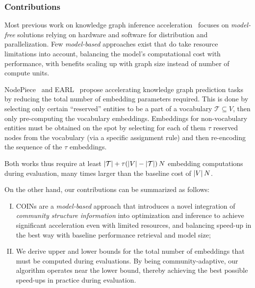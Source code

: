 \subsubsection{Contributions}
Most previous work on knowledge graph inference acceleration~\cite{lerer_pytorch-biggraph_2019,zheng_dgl-ke_2020,ren_smore_2021} focuses on \emph{model-free} solutions relying on hardware and software for distribution and parallelization. Few \emph{model-based} approaches exist that do take resource limitations into account, balancing the model's computational cost with performance, with benefits scaling up with graph size instead of number of compute units.

NodePiece~\cite{galkin_nodepiece_2022} and EARL~\cite{chen_entity-agnostic_2023} propose accelerating knowledge graph prediction tasks by reducing the total number of embedding parameters required. This is done by selecting only certain \enquote{reserved} entities to be a part of a vocabulary $\mathcal{T} \subseteq V$, then only pre-computing the vocabulary embeddings. Embeddings for non-vocabulary entities must be obtained on the spot by selecting for each of them $\tau$ reserved nodes from the vocabulary (via a specific assignment rule) and then re-encoding the sequence of the $\tau$ embeddings. 

Both works thus require at least $\mathopen{}\left|\mathcal{T}\right| + \tau\mathopen{}\left(\mathopen{}\left|V\right|-\mathopen{}\left|\mathcal{T}\right|\right)N$ embedding computations during evaluation, many times larger than the baseline cost of $\mathopen{}\left|V\right|N$.

On the other hand, our contributions can be summarized as follows: %
\begin{enumerate}[I.]
    \item COINs are a \emph{model-based} approach that introduces a novel integration of \emph{community structure information} into optimization and inference to achieve significant acceleration even with limited resources, and balancing speed-up in the best way with baseline performance retrieval and model size;
    \item We derive upper and lower bounds for the total number of embeddings that must be computed during evaluations. By being community-adaptive, our algorithm operates near the lower bound, thereby achieving the best possible speed-ups in practice during evaluation. 
    
\end{enumerate}


